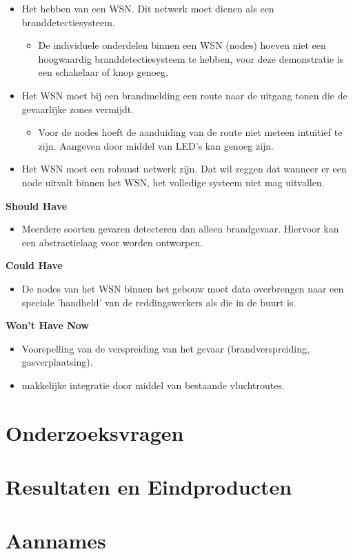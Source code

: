 \documentclass{../local}
\begin{document}
\begin{itemize}
\item Het hebben van een WSN. Dit netwerk moet dienen als een branddetectiesysteem.

\begin{itemize}
\item De individuele onderdelen binnen een WSN (nodes) hoeven niet een hoogwaardig branddetectiesysteem te hebben, voor deze demonstratie is een schakelaar of knop genoeg. 
\end{itemize}

\item Het WSN moet bij een brandmelding een route naar de uitgang tonen die de gevaarlijke zones vermijdt.

\begin{itemize}
\item Voor de nodes hoeft de aanduiding van de route niet meteen intuïtief te zijn. Aangeven door middel van LED's kan genoeg zijn.
\end{itemize}

\item Het WSN moet een robuust netwerk zijn. Dat wil zeggen dat wanneer er een node uitvalt binnen het WSN, het volledige systeem niet mag uitvallen.

\end{itemize}

\noindent\textbf{Should Have}
\begin{itemize}
\item Meerdere soorten gevaren detecteren dan alleen brandgevaar. Hiervoor kan een abstractielaag voor worden ontworpen.
\end{itemize}
\noindent\textbf{Could Have}
\begin{itemize}
\item De nodes van het WSN binnen het gebouw moet data overbrengen naar een speciale 'handheld' van de reddingswerkers als die in de buurt is.
\end{itemize}
\noindent\textbf{Won't Have Now}
\begin{itemize}
\item Voorspelling van de verspreiding van het gevaar (brandverspreiding, gasverplaatsing).
\item makkelijke integratie door middel van bestaande vluchtroutes.
\end{itemize}
\section{Onderzoeksvragen}

\section{Resultaten en Eindproducten}

\section{Aannames}
\end{document}
